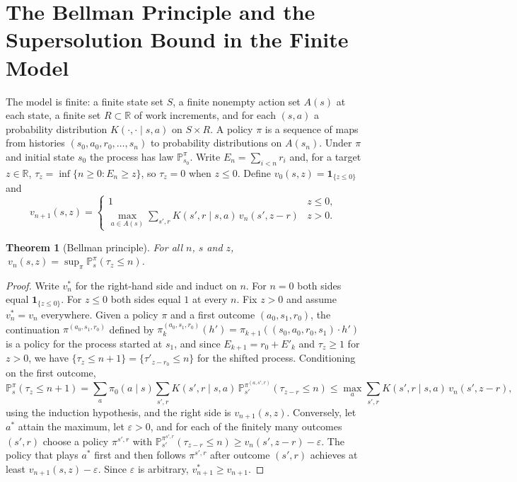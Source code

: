 \documentclass[11pt]{article}
\newtheorem{theorem}{Theorem}
\theoremstyle{definition}
\theoremstyle{remark}
\renewcommand{\Pr}{\mathbb{P}}
\begin{document}
\section{The Bellman Principle and the Supersolution Bound in the Finite Model}\label{app:bellman}

The model is finite: a finite state set $S$, a finite nonempty action set $A(s)$ at each state, a finite set $R \subset \mathbb{R}$ of work increments, and for each $(s,a)$ a probability distribution $K(\cdot, \cdot \mid s, a)$ on $S \times R$. A policy $\pi$ is a sequence of maps from histories $(s_0, a_0, r_0, \dots, s_n)$ to probability distributions on $A(s_n)$. Under $\pi$ and initial state $s_0$ the process has law $\Pr^\pi_{s_0}$. Write $E_n = \sum_{i<n} r_i$ and, for a target $z \in \mathbb{R}$, $\tau_z = \inf\{n \ge 0 : E_n \ge z\}$, so $\tau_z = 0$ when $z \le 0$. Define $v_0(s,z) = \mathbf{1}_{\{z \le 0\}}$ and
\[
v_{n+1}(s,z) = \begin{cases} 1 & z \le 0, \\ \max_{a \in A(s)} \sum_{s', r} K(s', r \mid s, a)\, v_n(s', z - r) & z > 0. \end{cases}
\]

\begin{theorem}[Bellman principle]\label{thm:bellmanapp}
For all $n$, $s$ and $z$, $\ v_n(s,z) = \sup_\pi \Pr^\pi_s(\tau_z \le n)$.
\end{theorem}

\begin{proof}
Write $v_n^*$ for the right-hand side and induct on $n$. For $n = 0$ both sides equal $\mathbf{1}_{\{z \le 0\}}$. For $z \le 0$ both sides equal $1$ at every $n$. Fix $z > 0$ and assume $v_n^* = v_n$ everywhere. Given a policy $\pi$ and a first outcome $(a_0, s_1, r_0)$, the continuation $\pi^{(a_0, s_1, r_0)}$ defined by $\pi^{(a_0, s_1, r_0)}_k(h') = \pi_{k+1}((s_0, a_0, r_0, s_1) \cdot h')$ is a policy for the process started at $s_1$, and since $E_{k+1} = r_0 + E'_k$ and $\tau_z \ge 1$ for $z > 0$, we have $\{\tau_z \le n+1\} = \{\tau'_{z - r_0} \le n\}$ for the shifted process. Conditioning on the first outcome,
\[
\Pr^\pi_s(\tau_z \le n+1) = \sum_{a} \pi_0(a \mid s) \sum_{s', r} K(s', r \mid s, a)\, \Pr^{\pi^{(a, s', r)}}_{s'}(\tau_{z - r} \le n) \le \max_a \sum_{s', r} K(s', r \mid s, a)\, v_n(s', z - r),
\]
using the induction hypothesis, and the right side is $v_{n+1}(s,z)$. Conversely, let $a^*$ attain the maximum, let $\varepsilon > 0$, and for each of the finitely many outcomes $(s', r)$ choose a policy $\pi^{s',r}$ with $\Pr^{\pi^{s',r}}_{s'}(\tau_{z-r} \le n) \ge v_n(s', z-r) - \varepsilon$. The policy that plays $a^*$ first and then follows $\pi^{s',r}$ after outcome $(s', r)$ achieves at least $v_{n+1}(s,z) - \varepsilon$. Since $\varepsilon$ is arbitrary, $v^*_{n+1} \ge v_{n+1}$.
\end{proof}
\end{document}
